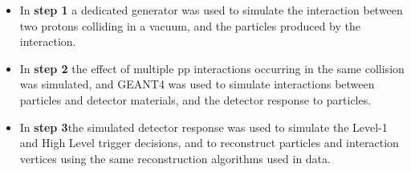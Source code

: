 




\begin{itemize}
	\item In \textbf{step 1} a dedicated \MC generator was used to simulate the interaction between two protons 
		colliding in a vacuum, and the particles produced by the interaction.
	\item In \textbf{step 2} the effect of multiple pp interactions occurring in the same collision was simulated, 
		and GEANT4 \cite{geant4} was used to simulate interactions between particles and detector materials, 
		and the detector response to particles.
	\item In \textbf{step 3}the simulated detector response was used to simulate the Level-1 and High Level 
		trigger decisions, and to reconstruct particles and interaction vertices using the same reconstruction 
		algorithms used in data.
\end{itemize}

